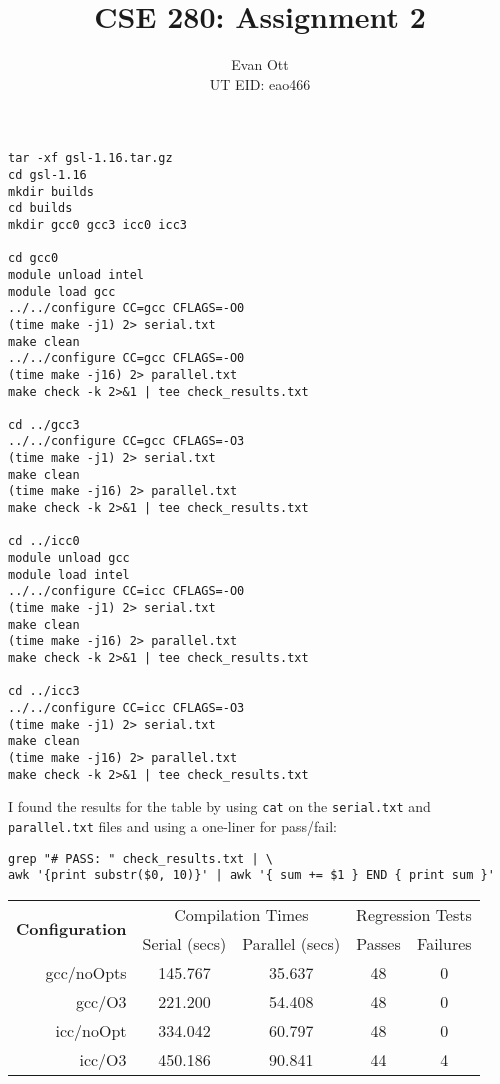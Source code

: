 \documentclass{article}
\title{\vspace{-6ex}CSE 280: Assignment 2\vspace{-2ex}}
\author{Evan Ott \\ UT EID: eao466\vspace{-2ex}}
\begin{document}
\maketitle

\begin{verbatim}
tar -xf gsl-1.16.tar.gz 
cd gsl-1.16
mkdir builds
cd builds
mkdir gcc0 gcc3 icc0 icc3

cd gcc0
module unload intel
module load gcc
../../configure CC=gcc CFLAGS=-O0
(time make -j1) 2> serial.txt
make clean
../../configure CC=gcc CFLAGS=-O0
(time make -j16) 2> parallel.txt
make check -k 2>&1 | tee check_results.txt

cd ../gcc3
../../configure CC=gcc CFLAGS=-O3
(time make -j1) 2> serial.txt
make clean
(time make -j16) 2> parallel.txt
make check -k 2>&1 | tee check_results.txt

cd ../icc0
module unload gcc
module load intel
../../configure CC=icc CFLAGS=-O0
(time make -j1) 2> serial.txt
make clean
(time make -j16) 2> parallel.txt
make check -k 2>&1 | tee check_results.txt

cd ../icc3
../../configure CC=icc CFLAGS=-O3
(time make -j1) 2> serial.txt
make clean
(time make -j16) 2> parallel.txt
make check -k 2>&1 | tee check_results.txt
\end{verbatim}

I found the results for the table by using \texttt{cat} on the \texttt{serial.txt} and \texttt{parallel.txt} files and using
a one-liner for pass/fail:
\begin{verbatim}
grep "# PASS: " check_results.txt | \
awk '{print substr($0, 10)}' | awk '{ sum += $1 } END { print sum }'
\end{verbatim}


\begin{table}[h]
\centering
\begin{tabular}{r||c|c|c|c|}
\hline
\multirow{ 2}{*}{\textbf{Configuration}} & \multicolumn{2}{c|}{Compilation Times} & \multicolumn{2}{c|}{Regression Tests}\\
 & Serial (secs) & Parallel (secs) & Passes& Failures\\
\hline
gcc/noOpts & 145.767 & 35.637 & 48 & 0\\ \hline
gcc/O3 & 221.200 & 54.408 & 48 & 0\\ \hline
icc/noOpt & 334.042 & 60.797 & 48 & 0\\ \hline
icc/O3 & 450.186 & 90.841 & 44& 4\\ \hline
\end{tabular}
\end{table}
\end{document}

